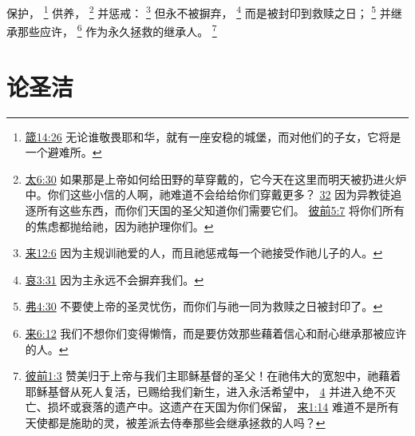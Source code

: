 \documentclass[12pt, a4paper, oneside]{ctexart}
\begin{document}
	保护，
	\footnote {
		\href{https://biblehub.com/proverbs/14-26.htm}{箴14:26} 无论谁敬畏耶和华，就有一座安稳的城堡，而对他们的子女，它将是一个避难所。
	}
	供养，
	\footnote {
		\href{https://biblehub.com/matthew/6-30.htm}{太6:30} 如果那是上帝如何给田野的草穿戴的，它今天在这里而明天被扔进火炉中。你们这些小信的人啊，祂难道不会给给你们穿戴更多？
		\href{https://biblehub.com/matthew/6-32.htm}{32} 因为异教徒追逐所有这些东西，而你们天国的圣父知道你们需要它们。
		\href{https://biblehub.com/1_peter/5-7.htm}{彼前5:7} 将你们所有的焦虑都抛给祂，因为祂护理你们。
	}
	并惩戒：
	\footnote {
		\href{https://biblehub.com/hebrews/12-6.htm}{来12:6} 因为主规训祂爱的人，而且祂惩戒每一个祂接受作祂儿子的人。
	}
	但永不被摒弃，
	\footnote {
		\href{https://biblehub.com/lamentations/3-31.htm}{哀3:31} 因为主永远不会摒弃我们。
	}
	而是被封印到救赎之日；
	\footnote {
		\href{https://biblehub.com/ephesians/4-30.htm}{弗4:30} 不要使上帝的圣灵忧伤，而你们与祂一同为救赎之日被封印了。
	}
	并继承那些应许，
	\footnote {
		\href{https://biblehub.com/hebrews/6-12.htm}{来6:12} 我们不想你们变得懒惰，而是要仿效那些藉着信心和耐心继承那被应许的人。
	}
	作为永久拯救的继承人。
	\footnote {
		\href{https://biblehub.com/1_peter/1-3.htm}{彼前1:3} 赞美归于上帝与我们主耶稣基督的圣父！在祂伟大的宽恕中，祂藉着耶稣基督从死人复活，已赐给我们新生，进入永活希望中，
		\href{https://biblehub.com/1_peter/1-4.htm}{4} 并进入绝不灭亡、损坏或衰落的遗产中。这遗产在天国为你们保留，
		\href{https://biblehub.com/hebrews/1-14.htm}{来1:14} 难道不是所有天使都是施助的灵，被差派去侍奉那些会继承拯救的人吗？
	}

\section{论圣洁}
\end{document}
